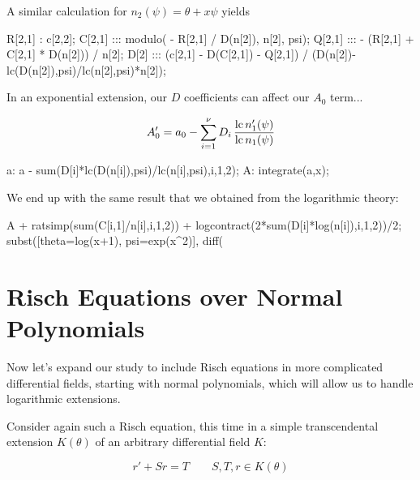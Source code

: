 A similar calculation for $n_2(\psi) = \theta + x \psi$ yields

\begin{maximablock}
R[2,1] : c[2,2];
C[2,1] ::: modulo( - R[2,1] / D(n[2]),
                     n[2], psi);
Q[2,1] ::: - (R[2,1] + C[2,1] * D(n[2]))
                     / n[2];
D[2] ::: (c[2,1] - D(C[2,1]) - Q[2,1])
/ (D(n[2])-lc(D(n[2]),psi)/lc(n[2],psi)*n[2]);
\end{maximablock}

In an exponential extension, our $D$ coefficients can affect our $A_0$ term...

$$A_0' = a_0 - \sum_{i=1}^\nu D_i \,\frac{{\rm lc\,} n_1'(\psi)}{{\rm lc\,} n_1(\psi)} $$

\begin{maximablock}
a: a - sum(D[i]*lc(D(n[i]),psi)/lc(n[i],psi),i,1,2);
A: integrate(a,x);
\end{maximablock}

\begin{comment}
\begin{maximablock}
rest(arrayinfo(D),2);
map(lambda([u], arraymake(D,u)), %
map(display,%
/* displayarray(D); */
\end{maximablock}
\end{comment}

We end up with
the same result that we obtained from the logarithmic theory:

\begin{maximablock}
A + ratsimp(sum(C[i,1]/n[i],i,1,2))
  + logcontract(2*sum(D[i]*log(n[i]),i,1,2))/2;
subst([theta=log(x+1), psi=exp(x^2)], %
diff(%
\end{maximablock}

\endexample

\vfill\eject
\section{Risch Equations over Normal Polynomials}

Now let's expand our study to include Risch equations in more
complicated differential fields, starting with normal polynomials,
which will allow us to handle logarithmic extensions.

Consider again such a Risch equation, this time in a simple
transcendental extension $K(\theta)$ of an arbitrary differential
field $K$:

$$r' + S r = T \qquad S,T,r \in K(\theta)$$

